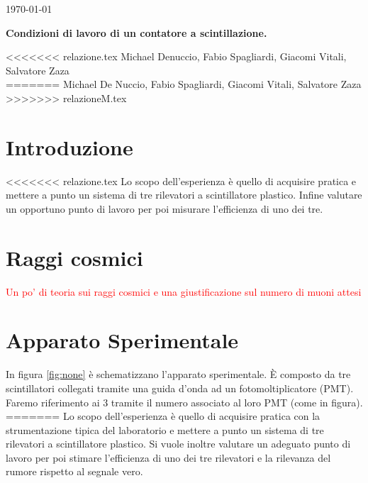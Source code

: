 \documentclass[a4paper,10pt]{article}
\newcommand{\note}[1]{\textcolor{red}{#1}}
\begin{document}
\begin{flushright}             
\today
\end{flushright} 

\begin{center}
\Large{\bf Condizioni di lavoro di un contatore a scintillazione. }

\vspace*{1cm}                                 
<<<<<<< relazione.tex
\large{Michael Denuccio, Fabio Spagliardi, Giacomi Vitali, Salvatore Zaza }\\ 
=======
\large{Michael De Nuccio, Fabio Spagliardi, Giacomi Vitali, Salvatore Zaza }\\ 
>>>>>>> relazioneM.tex
\vspace*{0.5cm}       
\vspace*{1.cm}
\end{center}



\section{Introduzione}
\label{sec:intro} 
<<<<<<< relazione.tex
Lo scopo dell'esperienza è quello di acquisire pratica e mettere a punto un sistema di tre rilevatori a scintillatore plastico. Infine valutare un opportuno punto di lavoro per poi misurare l'efficienza di uno dei tre.

\section{Raggi cosmici}
\note{Un po' di teoria sui raggi cosmici e una giustificazione sul numero di muoni attesi}

\section{Apparato Sperimentale}
In figura \ref{fig:none} è schematizzano l'apparato sperimentale. \`E composto da tre scintillatori collegati tramite una guida d'onda ad un fotomoltiplicatore (PMT). Faremo riferimento ai 3 tramite il numero associato al loro PMT (come in figura).
=======
Lo scopo dell'esperienza è quello di acquisire pratica con la strumentazione tipica del laboratorio e mettere a punto un sistema di tre rilevatori a scintillatore plastico. Si vuole inoltre valutare un adeguato punto di lavoro per poi stimare l'efficienza di uno dei tre rilevatori e la rilevanza del rumore rispetto al segnale vero.
\end{document}
